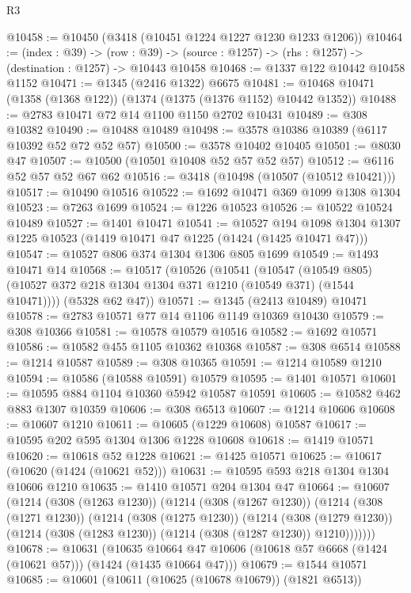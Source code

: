 \begin{lexlean}{R3}
\begin{coremodule}
@10458 := @10450 (@3418 (@10451 @1224 @1227 @1230 @1233 @1206))
@10464 := (index : @39) ->
  (row : @39) -> (source : @1257) -> (rhs : @1257) -> (destination : @1257) -> @10443 @10458
@10468 := @1337 @122 @10442 @10458 @1152
@10471 := @1345 (@2416 @1322) @6675
@10481 := @10468 @10471 (@1358 (@1368 @122)) (@1374 (@1375 (@1376 @1152) @10442 @1352))
@10488 := @2783 @10471 @72 @14 @1100 @1150 @2702 @10431
@10489 := @308 @10382
@10490 := @10488 @10489
@10498 := @3578 @10386 @10389 (@6117 @10392 @52 @72 @52 @57)
@10500 := @3578 @10402 @10405
@10501 := @8030 @47
@10507 := @10500 (@10501 @10408 @52 @57 @52 @57)
@10512 := @6116 @52 @57 @52 @67 @62
@10516 := @3418 (@10498 (@10507 (@10512 @10421)))
@10517 := @10490 @10516
@10522 := @1692 @10471 @369 @1099 @1308 @1304
@10523 := @7263 @1699
@10524 := @1226 @10523
@10526 := @10522 @10524 @10489
@10527 := @1401 @10471
@10541 := @10527
    @194
    @1098
    @1304
    @1307
    @1225
    @10523
    (@1419 @10471 @47 @1225 (@1424 (@1425 @10471 @47)))
@10547 := @10527 @806 @374 @1304 @1306 @805 @1699
@10549 := @1493 @10471 @14
@10568 := @10517
    (@10526
      (@10541
        (@10547
          (@10549 @805)
          (@10527 @372 @218 @1304 @1304 @371 @1210 (@10549 @371) (@1544 @10471))))
      (@5328 @62 @47))
@10571 := @1345 (@2413 @10489) @10471
@10578 := @2783 @10571 @77 @14 @1106 @1149 @10369 @10430
@10579 := @308 @10366
@10581 := @10578 @10579 @10516
@10582 := @1692 @10571
@10586 := @10582 @455 @1105 @10362 @10368
@10587 := @308 @6514
@10588 := @1214 @10587
@10589 := @308 @10365
@10591 := @1214 @10589 @1210
@10594 := @10586 (@10588 @10591) @10579
@10595 := @1401 @10571
@10601 := @10595 @884 @1104 @10360 @5942 @10587 @10591
@10605 := @10582 @462 @883 @1307 @10359
@10606 := @308 @6513
@10607 := @1214 @10606
@10608 := @10607 @1210
@10611 := @10605 (@1229 @10608) @10587
@10617 := @10595 @202 @595 @1304 @1306 @1228 @10608
@10618 := @1419 @10571
@10620 := @10618 @52 @1228
@10621 := @1425 @10571
@10625 := @10617 (@10620 (@1424 (@10621 @52)))
@10631 := @10595 @593 @218 @1304 @1304 @10606 @1210
@10635 := @1410 @10571 @204 @1304 @47
@10664 := @10607
    (@1214
      (@308 (@1263 @1230))
      (@1214
        (@308 (@1267 @1230))
        (@1214
          (@308 (@1271 @1230))
          (@1214
            (@308 (@1275 @1230))
            (@1214
              (@308 (@1279 @1230))
              (@1214 (@308 (@1283 @1230)) (@1214 (@308 (@1287 @1230)) @1210)))))))
@10678 := @10631
    (@10635 @10664 @47 @10606 (@10618 @57 @6668 (@1424 (@10621 @57))) (@1424 (@1435 @10664 @47)))
@10679 := @1544 @10571
@10685 := @10601 (@10611 (@10625 (@10678 @10679)) (@1821 @6513))

\end{coremodule}
\end{lexlean}

